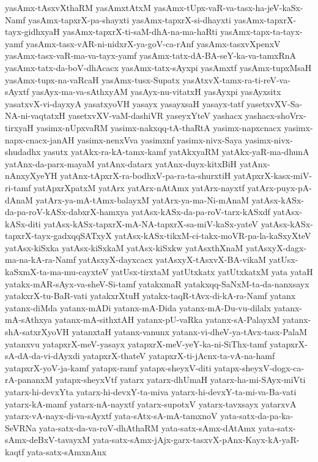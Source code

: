 {yasAmx-tAsxvXthaRM
yasAmxtAtxM
yasAmx-tUpx-vaR-va-tasx-ha-jeV-kaSx-Namf
yasAmx-tapxrX-pa-shayxti
yasAmx-tapxrX-si-dhayxti
yasAmx-tapxrX-tayx-gidhxyaH
yasAmx-tapxrX-ti-saM-dhA-na-ma-haRti
yasAmx-tapx-ta-tayx-yamf
yasAmx-tasx-vAR-ni-nidxrX-ya-goV-ca-rAnf
yasAmx-tasxvXpenxV
yasAmx-tasx-vaR-ma-va-tayx-yamf
yasAmx-tatx-dA-BA-seY-ka-va-tamxRnA
yasAmx-tatx-da-boV-dhAcacx
yasAmx-tatx-sAyxpi
yasAmxtf
yasAmx-tupxMsaH
yasAmx-tupx-na-vaRcaH
yasAmx-tusx-Supatx
yasAtxvX-tamx-ra-ti-reV-va-sAyxtf
yasAyx-ma-va-sAthxyAM
yasAyx-nu-vitatxH
yasAyxpi
yasAyxsitx
yasatxvX-vi-dayxyA
yasatxyoVH
yasayx
yasayxsaH
yasayx-tatf
yasetxvXV-Sa-NA-ni-vaqtatxH
yasetxvXV-vaM-dashiVR
yaseyxYteV
yashacx
yashacx-shoVrx-tirxyaH
yasimx-nUpxvaRM
yasimx-nakxqq-tA-thaRtA
yasimx-napxcnacx
yasimx-napx-cnacx-janAH
yasimx-nenxVva
yasimxnf
yasimx-nivx-Saya
yasimx-nivx-shudadhx
yasutx
yatAkx-ra-kA-tamx-kamf
yatAkxyaRM
yatAkx-yaR-ma-dhunA
yatAnx-da-parx-mayaM
yatAnx-datarx
yatAnx-duyx-kitxBiH
yatAnx-nAnxyXyeYH
yatAnx-tApxrX-ra-bodhxV-pa-ra-ta-shurxtiH
yatApxrX-kasx-miV-ri-tamf
yatApxrXpatxM
yatArx
yatArx-nAtAmx
yatArx-nayxtf
yatArx-puyx-pA-dAnaM
yatArx-ya-mA-tAmx-balayxM
yatArx-ya-ma-Ni-mAnaM
yatAsx-kASx-da-pa-roV-kASx-dabxrX-hamxya
yatAsx-kASx-da-pa-roV-tarx-kASxdf
yatAsx-kASx-diti
yatAsx-kASx-tapxrX-mA-NA-tapxrX-sa-miV-kaSx-yateV
yatAsx-kASx-tapxrX-tayx-gadxqqSATxyX
yatAsx-kASx-tikxM-ci-takx-moVR-pa-la-kaSxyXteV
yatAsx-kiSxka
yatAsx-kiSxkaM
yatAsx-kiSxkw
yatAsxthXnaM
yatAsxyX-dagx-ma-na-kA-ra-Namf
yatAsxyX-dayxcacx
yatAsxyX-tAsxvX-BA-vikaM
yatUsx-kaSxmX-ta-ma-mu-cayxteV
yatUsx-tirxtaM
yatUtxkatx
yatUtxkatxM
yata
yataH
yatakx-mAR-sAyx-va-sheV-Si-tamf
yatakxmaR
yatakxqq-SaNxM-ta-da-nanxsayx
yatakxrX-tu-BaR-vati
yatakxrXtuH
yatakx-taqR-tAvx-di-kA-ra-Namf
yatanx
yatanx-diMda
yatanx-mADi
yatanx-mA-Dida
yatanx-mA-Du-vu-dilalx
yatanx-mA-sAthxya
yatanx-mA-sithxtAH
yatanx-pU-vaRka
yatanx-sA-PalayxM
yatanx-shA-satxrXyoVH
yatanxtaH
yatanx-vanunx
yatanx-vi-dheV-ya-tAvx-tasx-PalaM
yatanxvu
yatapxrX-meV-yasayx
yatapxrX-meV-yeY-ka-ni-SiThx-tamf
yatapxrX-sA-dA-da-vi-dAyxdi
yatapxrX-thateV
yatapxrX-ti-jAcnx-ta-vA-na-hamf
yatapxrX-yoV-ja-kamf
yatapx-ramf
yatapx-sheyxV-diti
yatapx-sheyxV-dogx-ca-rA-pananxM
yatapx-sheyxVtf
yatarx
yatarx-dhUmaH
yatarx-ha-mi-SAyx-miVti
yatarx-hi-devxYta
yatarx-hi-devxY-ta-miva
yatarx-hi-devxY-ta-mi-va-Ba-vati
yatarx-kA-mamf
yatarx-nA-nayxtf
yatarx-supotxV
yatarx-tavxsayx
yatarxvA
yatarx-vA-nayx-di-va-sAyxtf
yata-sAtx-sA-mA-tamxnoV
yata-satx-da-pa-ka-SeVRNa
yata-satx-da-va-roV-dhAthaRM
yata-satx-sAmx-dAtAmx
yata-satx-sAmx-deBxV-tavayxM
yata-satx-sAmx-jAjx-garx-tasxvX-pAnx-Kayx-kA-yaR-kaqtf
yata-satx-sAmxnAnx
}
